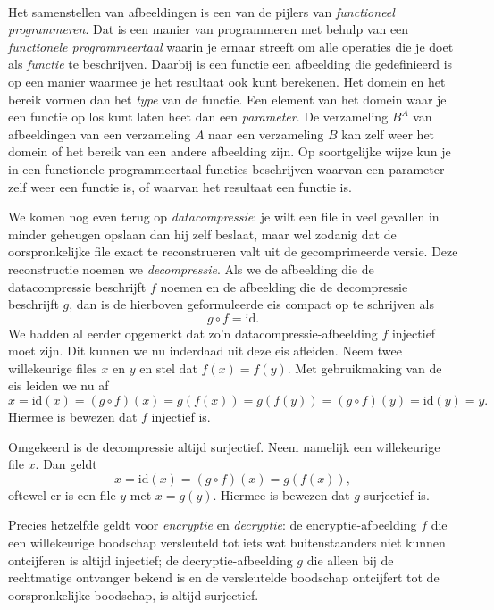 \begin{aside}\mbox{}\\
Het samenstellen van afbeeldingen is een van de pijlers van \textit{functioneel programmeren}. Dat is een manier van programmeren met behulp van een \textit{functionele programmeertaal} waarin je ernaar streeft om alle operaties die je doet als \textit{functie} te beschrijven. Daarbij is een functie een afbeelding die gedefinieerd is op een manier waarmee je het resultaat ook kunt berekenen. Het domein en het bereik vormen dan het \textit{type} van de functie. Een element van het domein waar je een functie op los kunt laten heet dan een \textit{parameter}. De verzameling $B^A$ van afbeeldingen van een verzameling $A$ naar een verzameling $B$ kan zelf weer het domein of het bereik van een andere afbeelding zijn. Op soortgelijke wijze kun je in een functionele programmeertaal functies beschrijven waarvan een parameter zelf weer een functie is, of waarvan het resultaat een functie is.
\end{aside}

We komen nog even terug op \textit{datacompressie}: je wilt een file in veel gevallen in minder geheugen opslaan dan hij zelf beslaat, maar wel zodanig dat de oorspronkelijke file exact te reconstrueren valt uit de gecomprimeerde versie. Deze reconstructie noemen we \textit{decompressie}. Als we de afbeelding die de datacompressie beschrijft $f$ noemen en de afbeelding die de decompressie beschrijft $g$, dan is de hierboven geformuleerde eis compact op te schrijven als
$$g\circ f=\text{id}.$$
We hadden al eerder opgemerkt dat zo'n datacompressie-afbeelding $f$ injectief moet zijn. Dit kunnen we nu inderdaad uit deze eis afleiden. Neem twee willekeurige files $x$ en $y$ en stel dat $f(x)=f(y)$. Met gebruikmaking van de eis leiden we nu af
$$x=\text{id}(x)=(g\circ f)(x)=g(f(x))=g(f(y))=(g\circ f)(y)=\text{id}(y)=y.$$
Hiermee is bewezen dat $f$ injectief is.

Omgekeerd is de decompressie altijd surjectief. Neem namelijk een willekeurige file $x$. Dan geldt
$$x=\text{id}(x)=(g\circ f)(x)=g(f(x)),$$
oftewel er is een file $y$ met $x=g(y)$. Hiermee is bewezen dat $g$ surjectief is.

Precies hetzelfde geldt voor \textit{encryptie} en \textit{decryptie}: de encryptie-afbeelding $f$ die een willekeurige boodschap versleuteld tot iets wat buitenstaanders niet kunnen ontcijferen is altijd injectief; de decryptie-afbeelding $g$ die alleen bij de rechtmatige ontvanger bekend is en de versleutelde boodschap ontcijfert tot de oorspronkelijke boodschap, is altijd surjectief.

